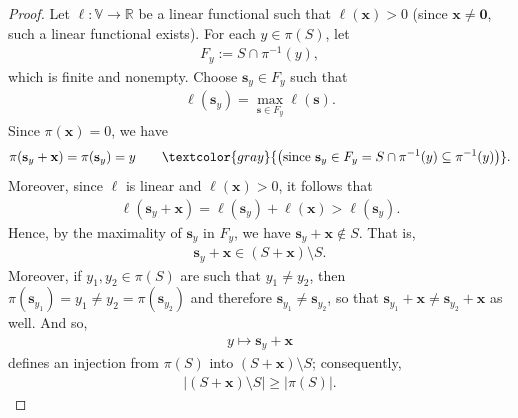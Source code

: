 \documentclass[12pt]{article}
\theoremstyle{definition}
\theoremstyle{remark}
\newcommand{\VV}{\mathbb{V}} %
\newcommand{\abs}[1]{\left| #1 \right|}
\begin{document}
\begin{proof}
Let $\ell : \VV \to \mathbb{R}$ be a linear functional such that $\ell(\mathbf{x}) > 0$ (since $\mathbf{x} \neq \mathbf{0}$, such a linear functional exists). For each $y \in \pi(S)$, let \begin{align*}
    F_y := S \cap \pi^{-1}(y),
\end{align*} which is finite and nonempty. Choose $\mathbf{s}_y \in F_y$ such that \begin{align*}
    \ell(\mathbf{s}_y) = \max_{\mathbf{s} \in F_y}\ell(\mathbf{s}).
\end{align*} Since $\pi(\mathbf{x}) = 0$, we have \begin{align*}
    \pi(\mathbf{s}_y + \mathbf{x}) = \pi(\mathbf{s}_y) = y
    \qquad \textcolor{gray}{\left(\text{since } \mathbf{s}_y \in F_y = S \cap \pi^{-1}(y) \subseteq \pi^{-1}(y)\right)}.
\end{align*} Moreover, since $\ell$ is linear and $\ell(\mathbf{x}) > 0$, it follows that \begin{align*}
    \ell(\mathbf{s}_y + \mathbf{x}) = \ell(\mathbf{s}_y) + \ell(\mathbf{x}) > \ell(\mathbf{s}_y).
\end{align*} Hence, by the maximality of $\mathbf{s}_y$ in $F_y$, we have $\mathbf{s}_y + \mathbf{x} \notin S$. That is, \begin{align*}
    \mathbf{s}_y + \mathbf{x} \in (S+\mathbf{x}) \setminus S.
\end{align*} Moreover, if $y_1,y_2 \in \pi(S)$ are such that $y_1 \neq y_2$, then $\pi(\mathbf{s}_{y_1}) = y_1 \neq y_2 = \pi(\mathbf{s}_{y_2})$ and therefore $\mathbf{s}_{y_1} \neq \mathbf{s}_{y_2}$, so that $\mathbf{s}_{y_1} + \mathbf{x} \neq \mathbf{s}_{y_2} + \mathbf{x}$ as well.
And so, \begin{align*}
    y \mapsto \mathbf{s}_y + \mathbf{x}
\end{align*} defines an injection from $\pi(S)$ into $(S+\mathbf{x}) \setminus S$; consequently, \begin{align}\label{injection}
    \abs{(S+\mathbf{x}) \setminus S} \geq \abs{\pi(S)}.
\end{align} 


\end{proof}
\end{document}
